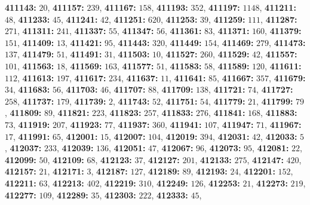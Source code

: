 \textsf{\bfseries 411143:} $20$, \textsf{\bfseries 411157:} $239$, \textsf{\bfseries 411167:} $158$, \textsf{\bfseries 411193:} $352$, \textsf{\bfseries 411197:} $1148$, \textsf{\bfseries 411211:} $48$, \textsf{\bfseries 411233:} $45$, \textsf{\bfseries 411241:} $42$, \textsf{\bfseries 411251:} $620$, \textsf{\bfseries 411253:} $39$, \textsf{\bfseries 411259:} $111$, \textsf{\bfseries 411287:} $271$, \textsf{\bfseries 411311:} $241$, \textsf{\bfseries 411337:} $55$, \textsf{\bfseries 411347:} $56$, \textsf{\bfseries 411361:} $83$, \textsf{\bfseries 411371:} $160$, \textsf{\bfseries 411379:} $151$, \textsf{\bfseries 411409:} $13$, \textsf{\bfseries 411421:} $95$, \textsf{\bfseries 411443:} $320$, \textsf{\bfseries 411449:} $154$, \textsf{\bfseries 411469:} $279$, \textsf{\bfseries 411473:} $137$, \textsf{\bfseries 411479:} $51$, \textsf{\bfseries 411491:} $31$, \textsf{\bfseries 411503:} $10$, \textsf{\bfseries 411527:} $260$, \textsf{\bfseries 411529:} $42$, \textsf{\bfseries 411557:} $101$, \textsf{\bfseries 411563:} $18$, \textsf{\bfseries 411569:} $163$, \textsf{\bfseries 411577:} $51$, \textsf{\bfseries 411583:} $58$, \textsf{\bfseries 411589:} $120$, \textsf{\bfseries 411611:} $112$, \textsf{\bfseries 411613:} $197$, \textsf{\bfseries 411617:} $234$, \textsf{\bfseries 411637:} $11$, \textsf{\bfseries 411641:} $85$, \textsf{\bfseries 411667:} $357$, \textsf{\bfseries 411679:} $34$, \textsf{\bfseries 411683:} $56$, \textsf{\bfseries 411703:} $46$, \textsf{\bfseries 411707:} $88$, \textsf{\bfseries 411709:} $138$, \textsf{\bfseries 411721:} $74$, \textsf{\bfseries 411727:} $258$, \textsf{\bfseries 411737:} $179$, \textsf{\bfseries 411739:} $2$, \textsf{\bfseries 411743:} $52$, \textsf{\bfseries 411751:} $54$, \textsf{\bfseries 411779:} $21$, \textsf{\bfseries 411799:} $79$, \textsf{\bfseries 411809:} $89$, \textsf{\bfseries 411821:} $223$, \textsf{\bfseries 411823:} $257$, \textsf{\bfseries 411833:} $276$, \textsf{\bfseries 411841:} $168$, \textsf{\bfseries 411883:} $73$, \textsf{\bfseries 411919:} $207$, \textsf{\bfseries 411923:} $77$, \textsf{\bfseries 411937:} $360$, \textsf{\bfseries 411941:} $107$, \textsf{\bfseries 411947:} $71$, \textsf{\bfseries 411967:} $17$, \textsf{\bfseries 411991:} $65$, \textsf{\bfseries 412001:} $15$, \textsf{\bfseries 412007:} $104$, \textsf{\bfseries 412019:} $394$, \textsf{\bfseries 412031:} $42$, \textsf{\bfseries 412033:} $5$, \textsf{\bfseries 412037:} $233$, \textsf{\bfseries 412039:} $136$, \textsf{\bfseries 412051:} $47$, \textsf{\bfseries 412067:} $96$, \textsf{\bfseries 412073:} $95$, \textsf{\bfseries 412081:} $22$, \textsf{\bfseries 412099:} $50$, \textsf{\bfseries 412109:} $68$, \textsf{\bfseries 412123:} $37$, \textsf{\bfseries 412127:} $201$, \textsf{\bfseries 412133:} $275$, \textsf{\bfseries 412147:} $420$, \textsf{\bfseries 412157:} $21$, \textsf{\bfseries 412171:} $3$, \textsf{\bfseries 412187:} $127$, \textsf{\bfseries 412189:} $89$, \textsf{\bfseries 412193:} $24$, \textsf{\bfseries 412201:} $152$, \textsf{\bfseries 412211:} $63$, \textsf{\bfseries 412213:} $402$, \textsf{\bfseries 412219:} $310$, \textsf{\bfseries 412249:} $126$, \textsf{\bfseries 412253:} $21$, \textsf{\bfseries 412273:} $219$, \textsf{\bfseries 412277:} $109$, \textsf{\bfseries 412289:} $35$, \textsf{\bfseries 412303:} $222$, \textsf{\bfseries 412333:} $45$, 
